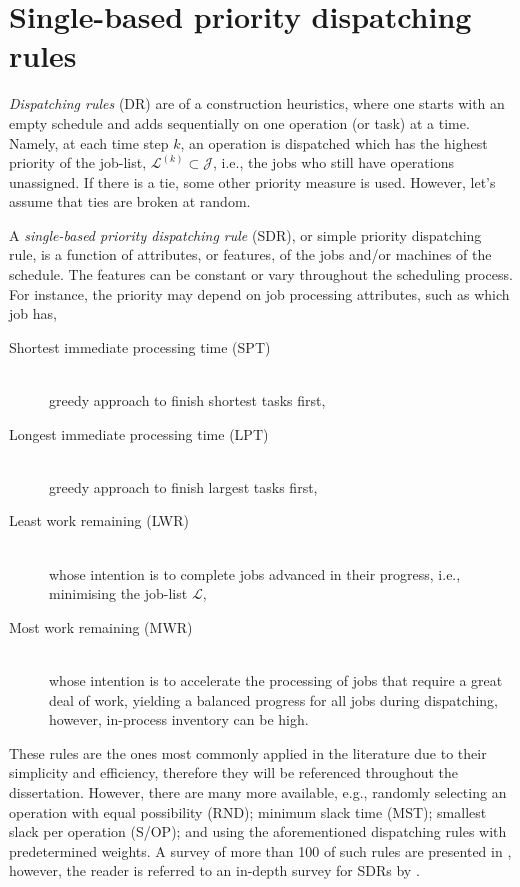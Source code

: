 \section{Single-based priority dispatching rules}\label{sec:SDR}
\emph{Dispatching rules} (DR) are of a construction heuristics, where one 
starts with an empty schedule and adds sequentially on one operation (or task) 
at a time. Namely, at each time step $k$, an operation is dispatched which has 
the highest priority of the job-list, 
\mbox{$\mathcal{L}^{(k)}\subset\mathcal{J}$}, i.e., the jobs who still have 
operations unassigned. If there is a tie, some other priority measure is used. 
However, let's assume that ties are broken at random. 

A \emph{single-based priority dispatching rule} (SDR), or simple priority 
dispatching rule, is a function of attributes, or features, of the jobs and/or 
machines of the schedule. The features can be constant or vary throughout the 
scheduling process. For instance, the priority may depend on job processing 
attributes, such as which job has, 
\begin{description}
	\item[Shortest immediate processing time (SPT)] \hfill \\
	greedy approach to finish shortest tasks first,  
	\item[Longest immediate processing time (LPT)] \hfill \\
	greedy approach to finish largest tasks first, 
	\item[Least work remaining (LWR)] \hfill \\
	whose intention is to complete jobs advanced in their pro\-gress, i.e., 
	minimising the job-list $\mathcal{L}$,
	\item[Most work remaining (MWR)] \hfill \\
	whose intention is to accelerate the processing of jobs that require a 
	great deal of work, yielding a balanced progress for all jobs during 
	dispatching, however, in-process inventory can be high.
\end{description}
These rules are the ones most commonly applied in the literature due to their simplicity and efficiency, %
therefore they will be referenced throughout the dissertation. 
However, there are many more available, e.g., randomly selecting an operation 
with equal possibility (RND); minimum slack time (MST); smallest slack per 
operation (S/OP); and using the aforementioned dispatching rules with 
predetermined weights. A survey of more than 100 of such rules are presented in 
\citet{Panwalkar77}, however, the reader is referred to an in-depth survey for 
SDRs by \citet{Haupt89}. 

